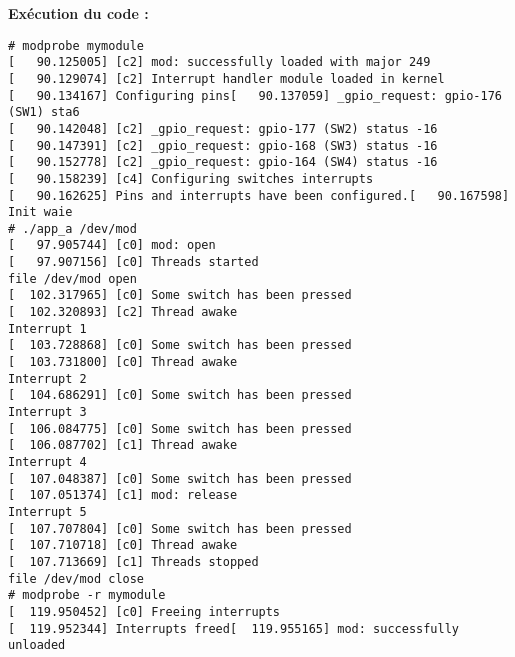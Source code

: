 \textbf{Exécution du code : } \\
\begin{lstlisting}
# modprobe mymodule                                                             
[   90.125005] [c2] mod: successfully loaded with major 249                     
[   90.129074] [c2] Interrupt handler module loaded in kernel                   
[   90.134167] Configuring pins[   90.137059] _gpio_request: gpio-176 (SW1) sta6
[   90.142048] [c2] _gpio_request: gpio-177 (SW2) status -16                    
[   90.147391] [c2] _gpio_request: gpio-168 (SW3) status -16                    
[   90.152778] [c2] _gpio_request: gpio-164 (SW4) status -16                    
[   90.158239] [c4] Configuring switches interrupts                             
[   90.162625] Pins and interrupts have been configured.[   90.167598] Init waie
# ./app_a /dev/mod                                                              
[   97.905744] [c0] mod: open                                                   
[   97.907156] [c0] Threads started                                             
file /dev/mod open                                                              
[  102.317965] [c0] Some switch has been pressed                                
[  102.320893] [c2] Thread awake                                                
Interrupt 1                                                                     
[  103.728868] [c0] Some switch has been pressed                                
[  103.731800] [c0] Thread awake                                                
Interrupt 2                                                                     
[  104.686291] [c0] Some switch has been pressed                                
Interrupt 3                                                                     
[  106.084775] [c0] Some switch has been pressed                                
[  106.087702] [c1] Thread awake                                                
Interrupt 4                                                                     
[  107.048387] [c0] Some switch has been pressed                                
[  107.051374] [c1] mod: release                                                
Interrupt 5                                                                     
[  107.707804] [c0] Some switch has been pressed                                
[  107.710718] [c0] Thread awake                                                
[  107.713669] [c1] Threads stopped                                             
file /dev/mod close                                                             
# modprobe -r mymodule                                                          
[  119.950452] [c0] Freeing interrupts                                          
[  119.952344] Interrupts freed[  119.955165] mod: successfully unloaded
\end{lstlisting}

